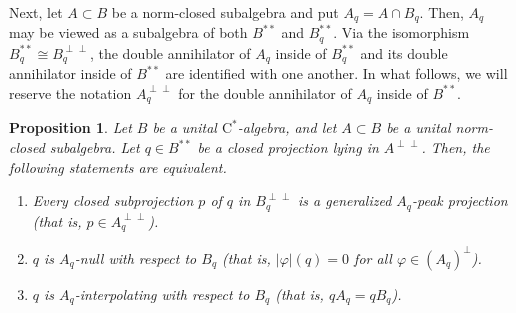\documentclass[10pt]{amsart}
\newcommand{\rC}{\mathrm{C}}
\newtheorem{proposition}[lemma]{Proposition}
\theoremstyle{definition}
\begin{document}
Next, let $A\subset B$ be a norm-closed subalgebra and put $A_q=A\cap B_q$. Then, $A_q$ may be viewed as a subalgebra of both $B^{**}$ and $B_q^{**}$.  Via the isomorphism $B_q^{**}\cong B_q^{\perp\perp}$, the double annihilator of $A_q$ inside of $B_q^{**}$ and its double annihilator inside of $B^{**}$ are identified with one another.  In what follows, we will reserve the notation $A_q^{\perp\perp}$ for the double annihilator of $A_q$ inside of $B^{**}$.


\begin{proposition} \label{P:commutanttrick} 
Let $B$ be a unital $\rC^*$-algebra, and let $A\subset B$ be a unital norm-closed subalgebra.  
Let $q\in B^{**}$ be a closed projection lying in $A^{\perp\perp}$. 
 Then, the following statements are equivalent.
\begin{enumerate}[{\rm (i)}]

\item Every closed subprojection $p$ of $q$ in 
$B_q^{\perp\perp}$ is a generalized $A_q$-peak projection (that is,
$p\in A_q^{\perp\perp}$).


\item $q$ is $A_q$-null with respect to $B_q$ 
(that is, $|\varphi | (q) = 0$ for all %
 $\varphi \in (A_q)^\perp$). 

\item $q$ is $A_q$-interpolating with respect to $B_q$ 
(that is, $q A_q = q B_q$). 
\end{enumerate} 
\end{proposition}
\end{document}
